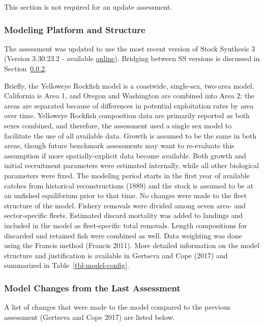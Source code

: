 \documentclass[
  english,
]{article}
\begin{document}
This section is not required for an update assessment.

\subsubsection{Modeling Platform and
Structure}\label{modeling-platform-and-structure}

The assessment was updated to use the most recent version of Stock
Synthesis 3 (Version 3.30.23.2 - available
\href{https://github.com/nmfs-ost/ss3-source-code/releases/tag/v3.30.23.2}{online}).
Bridging between SS versions is discussed in Section~\ref{sec-changes}.

Briefly, the Yelloweye Rockfish model is a coastwide, single-sex,
two-area model. California is Area 1, and Oregon and Washington are
combined into Area 2; the areas are separated because of differences in
potential exploitation rates by area over time. Yelloweye Rockfish
composition data are primarily reported as both sexes combined, and
therefore, the assessment used a single sex model to facilitate the use
of all available data. Growth is assumed to be the same in both areas,
though future benchmark assessments may want to re-evaluate this
assumption if more spatially-explicit data become available. Both growth
and initial recruitment parameters were estimated internally, while all
other biological parameters were fixed. The modeling period starts in
the first year of available catches from historical reconstructions
(1889) and the stock is assumed to be at an unfished equilibrium prior
to that time. No changes were made to the fleet structure of the model.
Fishery removals were divided among seven area- and sector-specific
fleets. Estimated discard mortality was added to landings and included
in the model as fleet-specific total removals. Length compositions for
discarded and retained fish were combined as well. Data weighting was
done using the Francis method (Francis 2011). More detailed information
on the model structure and justification is available in Gertseva and
Cope (2017) and summarized in Table~\ref{tbl-model-config}.

\subsubsection{Model Changes from the Last
Assessment}\label{sec-changes}

A list of changes that were made to the model compared to the previous
assessment (Gertseva and Cope 2017) are listed below.
\end{document}

